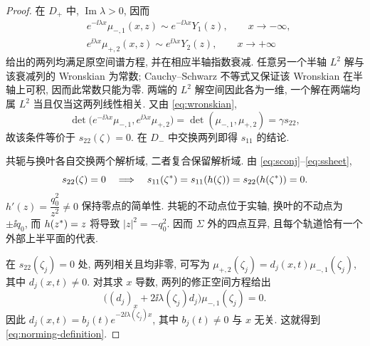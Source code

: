 \begin{proof}
在 $D_+$ 中, $\operatorname{Im}\lambda>0$, 因而
\begin{equation*}
\begin{aligned}
&e^{-\ii\lambda x}\mu_{-,1}(x,z)\sim e^{-\ii\lambda x}Y_1(z),\qquad x\to-\infty,\\
&e^{\ii\lambda x}\mu_{+,2}(x,z)\sim e^{\ii\lambda x}Y_2(z),\qquad x\to+\infty
\end{aligned}
\end{equation*}
给出的两列均满足原空间谱方程, 并在相应半轴指数衰减.
任意另一个半轴 $L^2$ 解与该衰减列的 Wronskian 为常数;
Cauchy--Schwarz 不等式又保证该 Wronskian 在半轴上可积, 因而此常数只能为零.
两端的 $L^2$ 解空间因此各为一维, 一个解在两端均属 $L^2$ 当且仅当这两列线性相关.
又由 \eqref{eq:wronskian},
\begin{equation*}
\det\bigl(e^{-\ii\lambda x}\mu_{-,1},e^{\ii\lambda x}\mu_{+,2}\bigr)
=\det(\mu_{-,1},\mu_{+,2})=\gamma s_{22},
\end{equation*}
故该条件等价于 $s_{22}(\zeta)=0$. 在 $D_-$ 中交换两列即得 $s_{11}$ 的结论.

共轭与换叶各自交换两个解析域, 二者复合保留解析域. 由 \eqref{eq:sconj}--\eqref{eq:ssheet},
\begin{equation*}
s_{22}(\zeta)=0
\quad\Longrightarrow\quad
s_{11}({\zeta}^{*})=s_{11}(h(\zeta))=s_{22}(h({\zeta}^{*}))=0.
\end{equation*}
$h'(z)=\dfrac{q_0^2}{z^2}\ne0$ 保持零点的简单性. 共轭的不动点位于实轴, 换叶的不动点为 $\pm\ii q_0$, 而 $h({z}^{*})=z$ 将导致 $|z|^2=-q_0^2$. 因而 $\Sigma$ 外的四点互异, 且每个轨道恰有一个外部上半平面的代表.


在 $s_{22}(\zeta_j)=0$ 处, 两列相关且均非零, 可写为
$\mu_{+,2}(\zeta_j)=d_j(x,t)\mu_{-,1}(\zeta_j)$, 其中 $d_j(x,t)\ne0$.
对其求 $x$ 导数, 两列的修正空间方程给出
\begin{equation*}
\bigl((d_j)_x+2\ii\lambda(\zeta_j)d_j\bigr)\mu_{-,1}(\zeta_j)=0.
\end{equation*}
因此 $d_j(x,t)=b_j(t)e^{-2\ii\lambda(\zeta_j)x}$,
其中 $b_j(t)\ne0$ 与 $x$ 无关. 这就得到 \eqref{eq:norming-definition}.

\end{proof}

